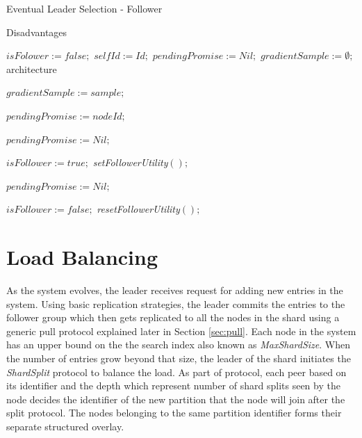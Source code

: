 \documentclass[a4paper,11pt]{kth-mag}
\begin{document}
\begin{algorithm}[h]
\caption{Eventual Leader Selection - Follower}
\label{follower}Disadvantages
\begin{algorithmic}[1]

  \State $isFolower := false;$
  \State $selfId := Id;$ $pendingPromise := Nil;$
  \State $gradientSample := \emptyset;$architecture
\EndUponS

  \State $gradientSample := sample;$
 \EndUpon

    \State $pendingPromise := nodeId;$
    \EndTrigger
    \TriggerS[promiseTimeout]{}\EndTriggerS
  \Else
     \EndTrigger
  \EndIf
\EndUpon

\UponS[promiseTimeout]{}
  \State $pendingPromise := Nil;$
\EndUponS

    \TriggerS[followerLeaseTimeout]{}\EndTriggerS
    \TriggerS[cancelPromiseTimeout]{}\EndTriggerS
    \State $isFollower := true;$
    \State \emph{setFollowerUtility}$();$
  \EndIf
\EndUpon

\UponS[promiseTimeout]{}
  \State $pendingPromise := Nil;$
\EndUponS

\UponS[leaseTimeout]{}
  \State $isFollower := false;$
  \State \emph{resetFollowerUtility}$();$
\EndUponS

\end{algorithmic}
\end{algorithm}


\section{Load Balancing}
\label{ssec:loadBalance}

As the system evolves, the leader receives request for adding new entries in the system. Using basic replication strategies, the leader commits the entries to the follower group which then gets replicated to all the nodes in the shard using a generic pull protocol explained later in Section \ref{sec:pull}. Each node in the system has an upper bound on the the search index also known as \textit{MaxShardSize}. When the number of entries grow beyond that size, the leader of the shard initiates the \textit{ShardSplit} protocol to balance the load. As part of protocol, each peer based on its identifier and the depth which represent number of shard splits seen by the node decides the identifier of the new partition that the node will join after the split protocol. The nodes belonging to the same partition identifier forms their separate structured overlay. 
\end{document}
